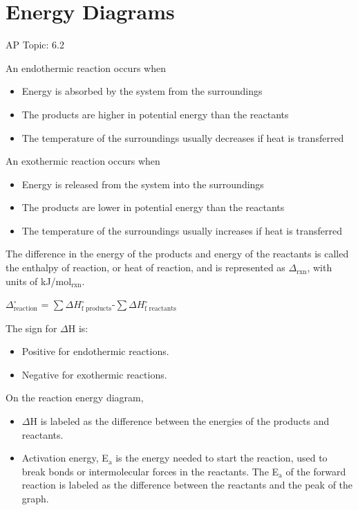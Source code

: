 \documentclass[../chem.tex]{subfiles}
\begin{document}
\section{Energy Diagrams}
AP Topic: 6.2

An endothermic reaction occurs when 
\begin{itemize}
    \item Energy is absorbed by the system from the surroundings
    \item The products are higher in potential energy than the reactants
    \item The temperature of the surroundings usually decreases if heat is transferred
\end{itemize}

An exothermic reaction occurs when 
\begin{itemize}
    \item Energy is released from the system into the surroundings
    \item The products are lower in potential energy than the reactants
    \item The temperature of the surroundings usually increases if heat is transferred
\end{itemize}

The difference in the energy of the products and energy of the reactants is called the enthalpy of reaction, or heat of reaction, and is 
represented as $\Delta_{\text{rxn}}$, with units of kJ/mol$_{\text{rxn}}$.
\begin{center}
    $\Delta^{\circ}_{\text{reaction}}$ = $\sum\Delta H_{\text{f products}}^{\circ}$-$\sum\Delta H_{\text{f reactants}}^{\circ}$
\end{center} 

The sign for $\Delta$H is:
\begin{itemize}
    \item Positive for endothermic reactions.
    \item Negative for exothermic reactions.
\end{itemize}

On the reaction energy diagram,
\begin{itemize}
    \item $\Delta$H is labeled as the difference between the energies of the products and reactants.
    \item Activation energy, E$_{\text{a}}$ is the energy needed to start the reaction, used to break bonds or intermolecular forces in the 
    reactants. The E$_{\text{a}}$ of the forward reaction is labeled as the difference between the reactants and the peak of the graph. 
\end{itemize}
\end{document}

